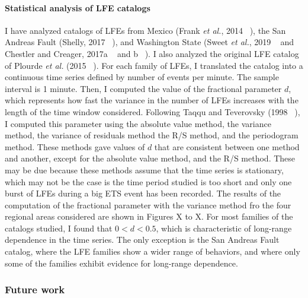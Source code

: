 \documentclass[letterpaper, 12pt]{article}
\begin{document}
\paragraph{Statistical analysis of LFE catalogs} I have analyzed catalogs of LFEs from Mexico (Frank \textit{et al.}, 2014 ~\cite{FRA_2014}), the San Andreas Fault (Shelly, 2017 ~\cite{SHE_2017}), and Washington State (Sweet \textit{et al.}, 2019 ~\cite{SWE_2019} and Chestler and Creager, 2017a ~\cite{CHE_2017_JGR} and b ~\cite{CHE_2017_G3}). I also analyzed the original LFE catalog of Plourde \textit{et al.} (2015 ~\cite{PLO_2015}). For each family of LFEs, I translated the catalog into a continuous time series defined by number of events per minute. The sample interval is 1 minute. Then, I computed the value of the fractional parameter $d$, which represents how fast the variance in the number of LFEs increases with the length of the time window considered. Following Taqqu and Teverovsky (1998 ~\cite{TAQ_1998}), I computed this parameter using the absolute value method, the variance method, the variance of residuals method the R/S method, and the periodogram method. These methods gave values of $d$ that are consistent between one method and another, except for the absolute value method, and the R/S method. These may be due because these methods assume that the time series is stationary, which may not be the case is the time period studied is too short and only one burst of LFEs during a big ETS event has been recorded. The results of the computation of the fractional parameter with the variance method fro the four regional areas considered are shown in Figures X to X. For most families of the catalogs studied, I found that $0 < d < 0.5$, which is characteristic of long-range dependence in the time series. The only exception is the San Andreas Fault catalog, where the LFE families show a wider range of behaviors, and where only some of the families exhibit evidence for long-range dependence.

\subsubsection*{Future work}
\end{document}
